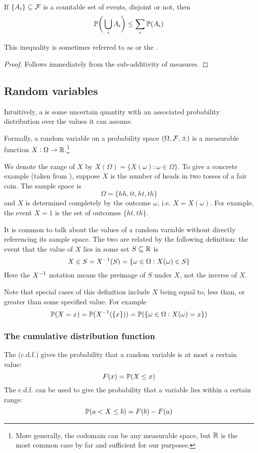 \documentclass{article}
\begin{document}
\begin{proposition}
If $\{A_i\} \subseteq \mathcal{F}$ is a countable set of events, disjoint or not, then
\[\mathbb{P}\bigg(\bigcup_i A_i\bigg) \leq \sum_i \mathbb{P}(A_i)\]
\end{proposition}
This inequality is sometimes referred to as  or the .
\begin{proof}
Follows immediately from the sub-additivity of measures.
\end{proof}

\subsection{Random variables}
Intuitively, a  is some uncertain quantity with an associated probability distribution over the values it can assume.

Formally, a random variable on a probability space $(\Omega, \mathcal{F}, \pm)$ is a measurable function $X: \Omega \to \mathbb{R}$.\footnote{
    More generally, the codomain can be any measurable space, but $\mathbb{R}$ is the most common case by far and sufficient for our purposes.
}

We denote the range of $X$ by $X(\Omega) = \{X(\omega) : \omega \in \Omega\}$.
To give a concrete example (taken from \cite{pitman}), suppose $X$ is the number of heads in two tosses of a fair coin.
The sample space is
\[\Omega = \{hh, tt, ht, th\}\]
and $X$ is determined completely by the outcome $\omega$, i.e. $X = X(\omega)$.
For example, the event $X = 1$ is the set of outcomes $\{ht, th\}$.

It is common to talk about the values of a random variable without directly referencing its sample space.
The two are related by the following definition: the event that the value of $X$ lies in some set $S \subseteq \mathbb{R}$ is
\[X \in S = X^{-1}(S) = \{\omega \in \Omega : X(\omega) \in S\}\]
Here the $X^{-1}$ notation means the preimage of $S$ under $X$, not the inverse of $X$.

Note that special cases of this definition include $X$ being equal to, less than, or greater than some specified value.
For example
\[\mathbb{P}(X = x) = \mathbb{P}(X^{-1}(\{x\})) = \mathbb{P}(\{\omega \in \Omega : X(\omega) = x\})\]

\subsubsection{The cumulative distribution function}
The  (c.d.f.) gives the probability that a random variable is at most a certain value:
\[F(x) = \mathbb{P}(X \leq x)\]
The c.d.f. can be used to give the probability that a variable lies within a certain range:
\[\mathbb{P}(a < X \leq b) = F(b) - F(a)\]
\end{document}
